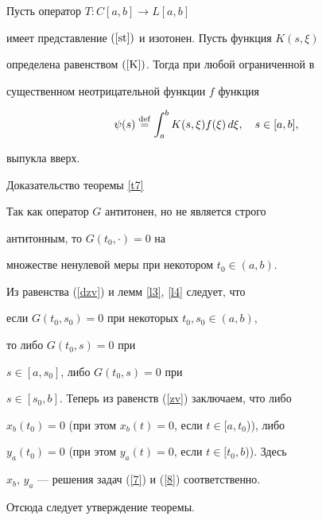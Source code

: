 \begin{lems}


\label{l4}


Пусть оператор $T:C[a,b]\to L[a,b]$


имеет представление $(\ref{st})$ и изотонен. Пусть функция $K(s,\xi)$


определена равенством $(\ref{K})$. Тогда при любой ограниченной в


существенном неотрицательной функции $f$ функция


$$


\psi(s)\df


\int_a^bK(s,\xi)f(\xi)\,d\xi,\quad s\in[a,b],


$$


выпукла вверх.


\end{lems}





\begin{pf*}{Доказательство теоремы \ref{t7}}


Так как оператор $G$ антитонен, но не является строго


антитонным, то $G(t_0,\cdot)=0$ на


множестве ненулевой меры при некотором $t_0\in(a,b)$.





Из равенства (\ref{dzv}) и лемм \ref{l3}, \ref{l4} следует, что


если $G(t_0,s_0)=0$ при некоторых $t_0,s_0\in(a,b)$,


то либо $G(t_0,s)=0$ при


$s\in[a,s_0]$, либо $G(t_0,s)=0$ при


$s\in[s_0,b]$. Теперь из равенств (\ref{zv}) заключаем, что либо


$x_b(t_0)=0$ (при этом $x_b(t)=0$, если $t\in[a,t_0$)), либо


$y_a(t_0)=0$ (при этом $y_a(t)=0$, если $t\in[t_0,b$)). Здесь


$x_b$, $y_a$ --- решения задач (\ref{7}) и (\ref{8}) соответственно.


Отсюда следует утверждение теоремы.


\end{pf*}





